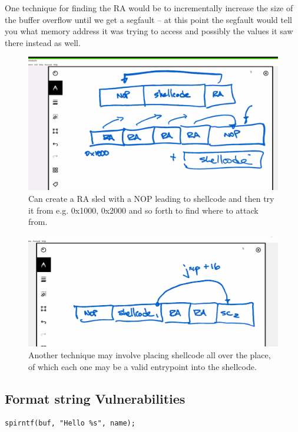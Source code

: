 \documentclass[../notes.tex]{subfiles}
\begin{document}
One technique for finding the RA would be to incrementally increase the size of the buffer overflow until we get a segfault -- at this point the segfault would tell you what memory address it was trying to access and possibly the values it saw there instead as well.

\begin{figure}[H]
    \centering
    \includegraphics[width=0.8\linewidth]{img/image_2023-01-16-18-37-29.png}
    \caption{Can create a RA sled with a NOP leading to shellcode and then try it from e.g. 0x1000, 0x2000 and so forth to find where to attack from.}



\end{figure}

\begin{figure}[H]
    \centering
    \includegraphics[width=0.8\linewidth]{img/image_2023-01-16-18-40-09.png}
    \caption{Another technique may involve placing shellcode all over the place, of which each one may be a valid entrypoint into the shellcode.}
\end{figure}



\subsection{Format string Vulnerabilities}
\begin{listing}[H]
\begin{verbatim}
spirntf(buf, "Hello %s", name);
\end{verbatim}
\end{listing}
\end{document}
